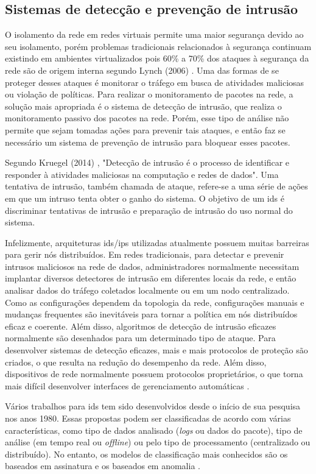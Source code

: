 \subsection{Sistemas de detecção e prevenção de intrusão}

O isolamento da rede em redes virtuais permite uma maior segurança devido ao seu isolamento, porém problemas tradicionais relacionados à segurança continuam existindo em ambientes virtualizados pois 60\% a 70\% dos ataques à segurança da rede são de origem interna segundo Lynch (2006) \nocite{Lynch:2006}. Uma das formas de se proteger desses ataques é monitorar o tráfego em busca de atividades maliciosas ou violação de políticas. Para realizar o monitoramento de pacotes na rede, a solução mais apropriada é o sistema de detecção de intrusão, que realiza o monitoramento passivo dos pacotes na rede. Porém, esse tipo de análise não permite que sejam tomadas ações para prevenir tais ataques, e então faz se necessário um sistema de prevenção de intrusão para bloquear esses pacotes.

Segundo Kruegel (2014) \nocite{Kruegel:2004}, "Detecção de intrusão é o processo de identificar e responder à atividades maliciosas na computação e redes de dados". Uma tentativa de intrusão, também chamada de ataque, refere-se a uma série de ações em que um intruso tenta obter o ganho do sistema. O objetivo de um \gls{ids} é discriminar tentativas de intrusão e preparação de intrusão do uso normal do sistema.

Infelizmente, arquiteturas \gls{ids}/\gls{ips} utilizadas atualmente possuem muitas barreiras para gerir nós distribuídos. Em redes tradicionais, para detectar e prevenir intrusos maliciosos na rede de dados, administradores normalmente necessitam implantar diversos detectores de intrusão em diferentes locais da rede, e então analisar dados do tráfego coletados localmente ou em um nodo centralizado. Como as configurações dependem da topologia da rede, configurações manuais e mudanças frequentes são inevitáveis para tornar a política em nós distribuídos eficaz e coerente. Além disso, algoritmos de detecção de intrusão eficazes normalmente são desenhados para um determinado tipo de ataque. Para desenvolver sistemas de detecção eficazes, mais e mais protocolos de proteção são criados, o que resulta na redução do desempenho da rede. Além disso, dispositivos de rede normalmente possuem protocolos proprietários, o que torna mais difícil desenvolver interfaces de gerenciamento automáticas \cite{Wang:2015}.

Vários trabalhos para \gls{ids} tem sido desenvolvidos desde o início de sua pesquisa nos anos 1980. Essas propostas podem ser classificadas de acordo com várias características, como tipo de dados analisado (\textit{logs} ou dados do pacote), tipo de análise (em tempo real ou \textit{offline}) ou pelo tipo de processamento (centralizado ou distribuído). No entanto, os modelos de classificação mais conhecidos são os baseados em assinatura e os baseados em anomalia \cite{Kolpyakwar:2017}.

